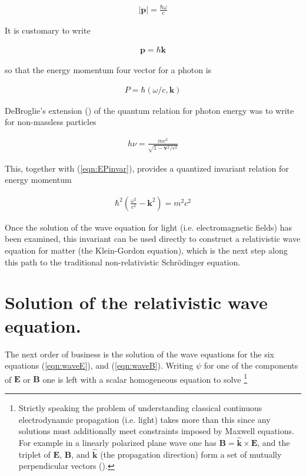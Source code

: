 \documentclass[]{eliblog}
\newcommand{\Abs}[1]{{\left\lvert{#1}\right\rvert}}
\newcommand{\BB}[0]{\mathbf{B}}
\newcommand{\BE}[0]{\mathbf{E}}
\newcommand{\Bk}[0]{\mathbf{k}}
\newcommand{\Bp}[0]{\mathbf{p}}
\newcommand{\Bv}[0]{\mathbf{v}}
\newcommand{\cross}[0]{\times}
\newcommand{\kcap}[0]{\hat{\Bk}}
\begin{document}
\begin{align}
\Abs{\Bp} = \frac{\hbar \omega}{c}
\end{align}

It is customary to write

\begin{align}
{\Bp} = \hbar \Bk
\end{align}

so that the energy momentum four vector for a photon is

\begin{align}
P = \hbar ( \omega/c, \Bk )
\end{align}

DeBroglie's extension (\cite{AFkracklauerDeBroglie}) of the quantum relation for photon energy was to write for non-massless particles

\begin{align}
h \nu = \frac{m c^2}{\sqrt{1 - \Bv^2/c^2}}
\end{align}

This, together with (\ref{eqn:EPinvar}), provides a quantized invariant relation for energy momentum

\begin{align}\label{eqn:DeBroglie}
\hbar^2 \left( \frac{\omega^2}{c^2} - \Bk^2 \right) = m^2 c^2
\end{align}

Once the solution of the wave equation for light (i.e. electromagnetic fields) has been examined, this invariant can be
used directly to construct a relativistic wave equation for matter (the Klein-Gordon equation), which is the next step along this path to the traditional non-relativistic Schr\"{o}dinger equation.

\section{Solution of the relativistic wave equation.}

The next order of business is the solution of the wave equations for the six 
equations (\ref{eqn:waveE}), and (\ref{eqn:waveB}).  
Writing $\psi$ for one of the components of $\BE$ or $\BB$ one is left with a scalar homogeneous equation to solve
\footnote{Strictly speaking the problem of understanding classical continuous electrodynamic propagation (i.e. light) takes more than this since any solutions must additionally meet constraints imposed by Maxwell equations.  For example in a linearly polarized plane wave one has $\BB = \kcap \cross \BE$, and the triplet of $\BE$, $\BB$, and $\kcap$ (the propagation direction) form a set of mutually perpendicular vectors (\cite{jackson1975cewWave}).}
\end{document}
